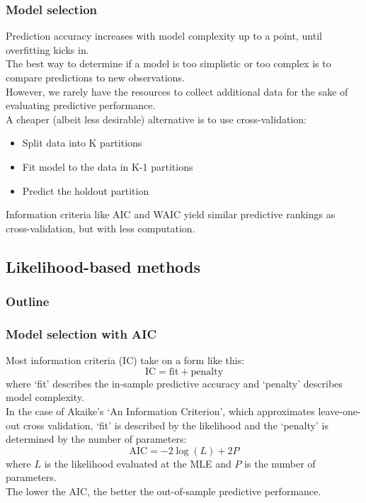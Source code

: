 \documentclass[color=usenames,dvipsnames]{beamer}\usepackage[]{graphicx}\usepackage[]{color}
\begin{document}
\begin{frame}
  \frametitle{Model selection}
  Prediction accuracy increases with model complexity up to a point,
  until overfitting kicks in. \\
  \pause
  \vfill
  The best way to determine if a model is too simplistic or too
  complex is to compare predictions to new observations. \\
  \pause
  \vfill
  However, we rarely have the resources to
  collect additional data for the sake of evaluating predictive
  performance. \\ 
  \pause
  \vfill
  A cheaper (albeit less desirable) alternative is to use
  cross-validation: 
  \begin{itemize}
    \item Split data into K partitions
    \item Fit model to the data in K-1 partitions
    \item Predict the holdout partition
  \end{itemize}
  \pause
  \vfill
  Information criteria like AIC and WAIC yield similar predictive
  rankings as cross-validation, but with less computation.    
\end{frame}



\subsection{Likelihood-based methods}



\begin{frame}
  \frametitle{Outline}
  \Large
\end{frame}





\begin{frame}
  \frametitle{Model selection with AIC}
  \small
  Most information criteria (IC) take on a form like this:
  \[
     \mathrm{IC} = \mathrm{fit} + \mathrm{penalty}
  \]
  where `fit' describes the \alert{in-sample} predictive accuracy and 
  `penalty' describes model complexity. \\
  \pause
  \vfill
  In the case of Akaike's `An Information Criterion', which
  approximates leave-one-out cross validation, `fit' is described by
  the likelihood and the `penalty' is determined by the number of parameters:
  \[
     \mathrm{AIC} = -2 \log(L) + 2P 
   \]
   where $L$ is the likelihood evaluated at the MLE and $P$ is
   the number of parameters. \\
   \pause
   \vfill
   The lower the AIC, the better the \alert{out-of-sample} predictive
   performance.
\end{frame}
\end{document}
